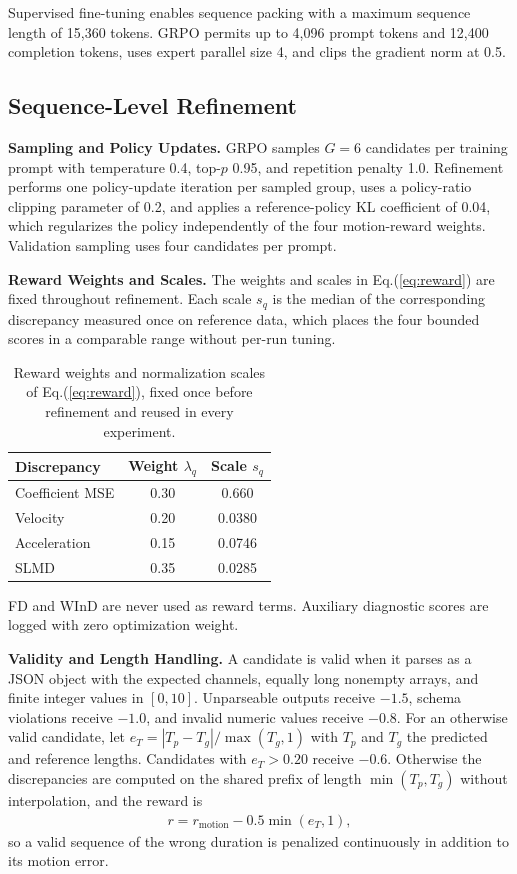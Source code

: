 Supervised fine-tuning enables sequence packing with a maximum sequence length of 15{,}360 tokens. GRPO permits up to 4{,}096 prompt tokens and 12{,}400 completion tokens, uses expert parallel size 4, and clips the gradient norm at 0.5.

\subsection{Sequence-Level Refinement}
\label{app:refinement}

\noindent\textbf{Sampling and Policy Updates.}\quad
GRPO samples $G=6$ candidates per training prompt with temperature 0.4, top-$p$ 0.95, and repetition penalty 1.0. Refinement performs one policy-update iteration per sampled group, uses a policy-ratio clipping parameter of 0.2, and applies a reference-policy KL coefficient of 0.04, which regularizes the policy independently of the four motion-reward weights. Validation sampling uses four candidates per prompt.

\noindent\textbf{Reward Weights and Scales.}\quad
The weights and scales in Eq.(\ref{eq:reward}) are fixed throughout refinement. Each scale $s_{q}$ is the median of the corresponding discrepancy measured once on reference data, which places the four bounded scores in a comparable range without per-run tuning.

\begin{table}[h]
\centering
\caption{Reward weights and normalization scales of Eq.(\ref{eq:reward}), fixed once before refinement and reused in every experiment.}
\label{tab:reward}
\small
\begin{tabular}{lcc}
\toprule
Discrepancy & Weight $\lambda_{q}$ & Scale $s_{q}$ \\
\midrule
Coefficient MSE & 0.30 & 0.660 \\
Velocity & 0.20 & 0.0380 \\
Acceleration & 0.15 & 0.0746 \\
SLMD & 0.35 & 0.0285 \\
\bottomrule
\end{tabular}
\end{table}

FD and WInD are never used as reward terms. Auxiliary diagnostic scores are logged with zero optimization weight.

\noindent\textbf{Validity and Length Handling.}\quad
A candidate is valid when it parses as a JSON object with the expected channels, equally long nonempty arrays, and finite integer values in $[0,10]$. Unparseable outputs receive $-1.5$, schema violations receive $-1.0$, and invalid numeric values receive $-0.8$. For an otherwise valid candidate, let $e_{T}=|T_{p}-T_{g}|/\max(T_{g},1)$ with $T_{p}$ and $T_{g}$ the predicted and reference lengths. Candidates with $e_{T}>0.20$ receive $-0.6$. Otherwise the discrepancies are computed on the shared prefix of length $\min(T_{p},T_{g})$ without interpolation, and the reward is
\begin{gather}
r=r_{\mathrm{motion}}-0.5\min\!\left(e_{T},1\right),
\end{gather}
so a valid sequence of the wrong duration is penalized continuously in addition to its motion error.

